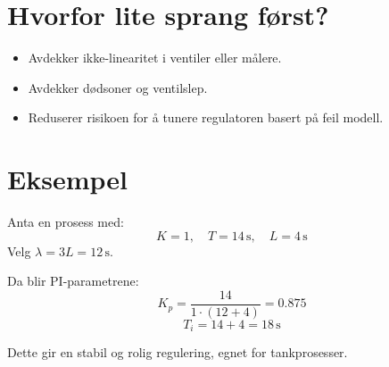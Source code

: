 \documentclass{minmal}
\begin{document}
\section{Hvorfor lite sprang først?}
\begin{itemize}
    \item Avdekker ikke-linearitet i ventiler eller målere.
    \item Avdekker dødsoner og ventilslep.
    \item Reduserer risikoen for å tunere regulatoren basert på feil modell.
\end{itemize}
 
\section{Eksempel}
Anta en prosess med:
\[
K = 1, \quad T = 14\,\text{s}, \quad L = 4\,\text{s}
\]
Velg $\lambda = 3L = 12\,\text{s}$.
 
Da blir PI-parametrene:
\[
K_p = \frac{14}{1 \cdot (12 + 4)} = 0.875
\]
\[
T_i = 14 + 4 = 18\,\text{s}
\]
 
Dette gir en stabil og rolig regulering, egnet for tankprosesser.
 
\end{document}
